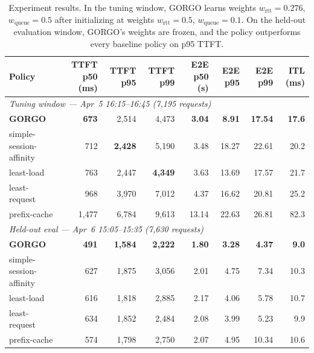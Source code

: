 \documentclass{article}
\begin{document}
\begin{table}[ht]
\centering
\small
\caption{Experiment results. In the tuning window, GORGO learns weights $w_{\mathrm{rtt}}{=}0.276$, $w_{\mathrm{queue}}{=}0.5$ after initializing
at weights $w_{\mathrm{rtt}}{=}0.5$, $w_{\mathrm{queue}}{=}0.1$. On the held-out evaluation window, GORGO's weights are frozen, and
the policy outperforms every baseline policy on p95 TTFT.}
\label{tab:results}
\setlength{\tabcolsep}{2.7pt}
\begin{tabular}{lrrrrrrr}
\toprule
Policy & TTFT p50 (ms) & TTFT p95 & TTFT p99 & E2E p50 (s) & E2E p95 & E2E p99 & ITL (ms) \\
\midrule
\multicolumn{8}{l}{\textit{Tuning window --- Apr~5 16:15--16:45 (7{,}195 requests)}} \\
\midrule
\textbf{GORGO}          & \textbf{673} & 2{,}514          & 4{,}473          & \textbf{3.04}  & \textbf{8.91}  & \textbf{17.54} & \textbf{17.6} \\
simple-session-affinity & 712          & \textbf{2{,}428} & 5{,}190          & 3.48           & 18.27          & 22.61          & 20.2 \\
least-load              & 763          & 2{,}447          & \textbf{4{,}349} & 3.63           & 13.69          & 17.57          & 21.7 \\
least-request           & 968          & 3{,}970          & 7{,}012          & 4.37           & 16.62          & 20.81          & 25.2 \\
prefix-cache            & 1{,}477      & 6{,}784          & 9{,}613          & 13.14          & 22.63          & 26.81          & 82.3 \\
\midrule
\multicolumn{8}{l}{\textit{Held-out eval --- Apr~6 15:05--15:35 (7{,}630 requests)}} \\
\midrule
\textbf{GORGO}          & \textbf{491} & \textbf{1{,}584} & \textbf{2{,}222} & \textbf{1.80}  & \textbf{3.28}  & \textbf{4.37}  & \textbf{9.0} \\
simple-session-affinity & 627          & 1{,}875          & 3{,}056          & 2.01           & 4.75           & 7.34           & 10.3 \\
least-load              & 616          & 1{,}818          & 2{,}885          & 2.17           & 4.06           & 5.78           & 10.7 \\
least-request           & 634          & 1{,}852          & 2{,}484          & 2.08           & 3.99           & 5.23           & 9.9 \\
prefix-cache            & 574          & 1{,}798          & 2{,}750          & 2.07           & 4.95           & 10.34          & 10.6 \\
\bottomrule
\end{tabular}
\end{table}
\end{document}
